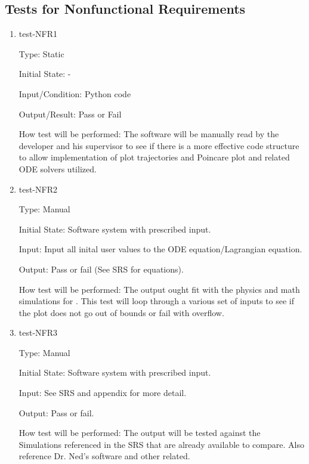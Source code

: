 \documentclass[12pt, titlepage]{article}
\begin{document}

\subsection{Tests for Nonfunctional Requirements}

\begin{enumerate}

\item{test-NFR1\\}

Type: Static
					
Initial State: -
					
Input/Condition: \progname Python code
					
Output/Result: Pass or Fail
					
How test will be performed: The software will be manually read by the developer 
and his supervisor to see if there is a more effective code structure to allow 
implementation of plot trajectories and Poincare plot and related ODE solvers
utilized.  

\item{test-NFR2\\} 

Type: Manual 

Initial State: Software system with prescribed input.

Input: Input all inital user values to the ODE equation/Lagrangian equation.

Output: Pass or fail (See SRS for equations).

How test will be performed: The output ought fit with the physics and math 
simulations for \progname. This test will loop through a various set of inputs 
to see if the plot does not go out of bounds or fail with overflow.

\item{test-NFR3\\} 

Type: Manual 

Initial State: Software system with prescribed input.

Input: See SRS and appendix for more detail.

Output: Pass or fail.

How test will be performed: The output will be tested against the Simulations
referenced in the SRS that are already available to compare. Also reference
Dr. Ned's software and other related. \\ 

\end{enumerate}
\end{document}
